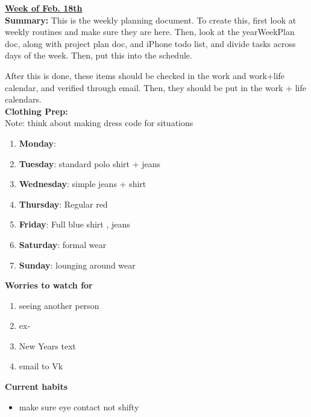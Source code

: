 \documentclass[11pt]{article}
\begin{document}
{\huge{\underline{\textbf{Week of Feb. 18th}}}} \\

\textbf{Summary:} This is the weekly planning document. To create
this, first look at weekly routines and make sure they are here. Then,
look at the yearWeekPlan doc, along with project plan doc, and iPhone
todo list, and divide tasks across days of the week. Then, put this
into the schedule.

After this is done, these items should be checked in the work and
work+life calendar, and verified through email.
Then, they should be put in the work + life
calendars. \\

\textbf{Clothing Prep: } \\
Note: think about making dress code for situations
\begin{enumerate}
\item \textbf{Monday}:
\item \textbf{Tuesday}: standard polo shirt + jeans
\item \textbf{Wednesday}: simple jeans + shirt
\item \textbf{Thursday}: Regular red
\item \textbf{Friday}: Full blue shirt , jeans
\item \textbf{Saturday}: formal wear
\item \textbf{Sunday}: lounging around wear
\end{enumerate}


\textbf{Worries to watch for} \\
\begin{enumerate}
\item seeing another person
\item ex-
\item New Years text
\item email to Vk
\end{enumerate}

\textbf{Current habits}\\
\begin{itemize}
\item make sure eye contact not shifty
\end{itemize}
\end{document}
